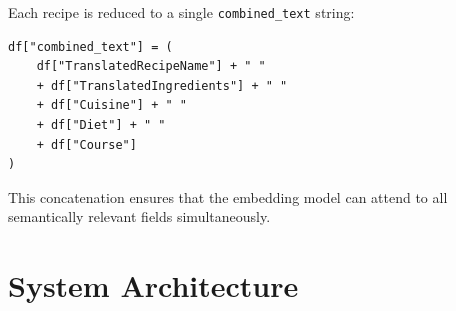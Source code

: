 \documentclass[12pt,a4paper]{article}
\begin{document}
Each recipe is reduced to a single \texttt{combined\_text} string:

\begin{lstlisting}[caption={Building combined\_text}]
df["combined_text"] = (
    df["TranslatedRecipeName"] + " "
    + df["TranslatedIngredients"] + " "
    + df["Cuisine"] + " "
    + df["Diet"] + " "
    + df["Course"]
)
\end{lstlisting}

This concatenation ensures that the embedding model can attend to all
semantically relevant fields simultaneously.

\section{System Architecture}
\end{document}
